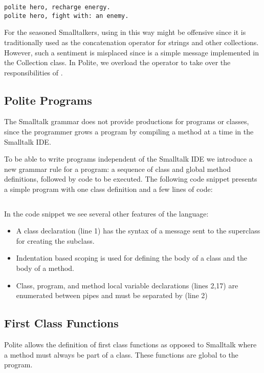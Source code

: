 \begin{verbatim} 
polite hero, recharge energy. 
polite hero, fight with: an enemy.
\end{verbatim}

For the seasoned Smalltalkers, using \comma in this way might be offensive since it is traditionally used as the concatenation operator for strings and other collections. However, such a sentiment is misplaced since \comma is a simple message implemented in the Collection class. In Polite, we overload the \plus operator to take over the responsibilities of \comma.


\subsection{Polite Programs}
The Smalltalk grammar does not provide productions for programs or classes, since the programmer grows a program by compiling a method at a time in the Smalltalk IDE. 

To be able to write programs independent of the Smalltalk IDE we introduce a new grammar rule for a program: a sequence of class and global method definitions, followed by code to be executed. The following code snippet presents a simple program with one class definition and a few lines of code: 

\inputminted[bgcolor=lbcolor,linenos]{text}{polite-hero.polite}

In the code snippet we see several other features of the language: 

\begin{itemize}

	\item A class declaration (line 1) has the syntax of a message sent to the superclass for creating the subclass. 

	\item Indentation based scoping is used for defining the body of a class and the body of a method. 

	\item Class, program, and method local variable declarations (lines 2,17) are enumerated between pipes and must be separated by \comma (line 2)

\end{itemize}


\subsection {First Class Functions}
Polite allows the definition of first class functions as opposed to Smalltalk where a method must always be part of a class. These functions are global to the program. 

